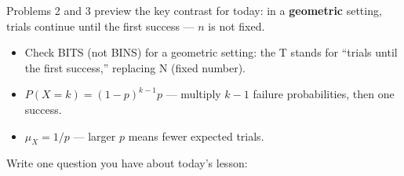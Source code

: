 \documentclass[10pt]{article}
\begin{document}
\vspace{0.05in}

\noindent Problems 2 and 3 preview the key contrast for today: in a \textbf{geometric}
setting, trials continue until the first success --- $n$ is not fixed.

\vspace{0.05in}

\begin{tcolorbox}[colback=greenbg, colframe=greenacc, boxrule=0.8pt, arc=2mm,
    left=4mm, right=4mm, top=2mm, bottom=2mm]
    \small
    \begin{itemize}[leftmargin=1.3em, itemsep=2pt]
  \item Check BITS (not BINS) for a geometric setting: the T stands for
        ``trials until the first success,'' replacing N (fixed number).
  \item $P(X = k) = (1-p)^{k-1}p$ --- multiply $k-1$ failure probabilities,
        then one success.
  \item $\mu_X = 1/p$ --- larger $p$ means fewer expected trials.
    \end{itemize}
\end{tcolorbox}

\vspace{0.05in}

\noindent\textcolor{slate}{\small Write one question you have about today's lesson:}\\[2pt]
\\[2pt]\ansline{}
\end{document}

